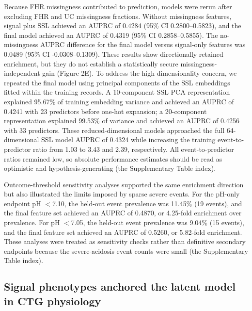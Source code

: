 \documentclass[11pt]{article}
\begin{document}
Because FHR missingness contributed to prediction, models were rerun after excluding FHR and UC missingness fractions. Without missingness features, signal plus SSL achieved an AUPRC of 0.4284 (95\% CI 0.2800--0.5823), and the final model achieved an AUPRC of 0.4319 (95\% CI 0.2858--0.5855). The no-missingness AUPRC difference for the final model versus signal-only features was 0.0489 (95\% CI -0.0308--0.1309). These results show directionally retained enrichment, but they do not establish a statistically secure missingness-independent gain (Figure 2E). To address the high-dimensionality concern, we repeated the final model using principal components of the SSL embeddings fitted within the training records. A 10-component SSL PCA representation explained 95.67\% of training embedding variance and achieved an AUPRC of 0.4241 with 23 predictors before one-hot expansion; a 20-component representation explained 99.53\% of variance and achieved an AUPRC of 0.4256 with 33 predictors. These reduced-dimensional models approached the full 64-dimensional SSL model AUPRC of 0.4324 while increasing the training event-to-predictor ratio from 1.03 to 3.43 and 2.39, respectively. All event-to-predictor ratios remained low, so absolute performance estimates should be read as optimistic and hypothesis-generating (the Supplementary Table index).

Outcome-threshold sensitivity analyses supported the same enrichment direction but also illustrated the limits imposed by sparse severe events. For the pH-only endpoint pH $<$7.10, the held-out event prevalence was 11.45\% (19 events), and the final feature set achieved an AUPRC of 0.4870, or 4.25-fold enrichment over prevalence. For pH $<$7.05, the held-out event prevalence was 9.04\% (15 events), and the final feature set achieved an AUPRC of 0.5260, or 5.82-fold enrichment. These analyses were treated as sensitivity checks rather than definitive secondary endpoints because the severe-acidosis event counts were small (the Supplementary Table index).

\subsection{Signal phenotypes anchored the latent model in CTG physiology}
\end{document}
